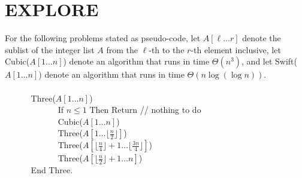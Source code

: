 \documentclass[paper=a4,fontsize=11pt]{article}
\begin{document}
\section{EXPLORE}
For the following problems stated as pseudo-code, let $A[\ell\dots r]$ denote the sublist of the integer list $A$ from the $\ell$-th to the $r$-th element inclusive, let Cubic($A[1\dots n]$) denote an algorithm that runs in time $\Theta(n^3)$, and let Swift($A[1\dots n]$) denote an algorithm that runs in time $\Theta(n\log(\log n))$.\\
{\ttfamily
$\phantom{A}$\\
$\phantom{---}$ Three($A[1\dots n]$)\\
$\phantom{--- ---}$ If $n \leq 1$ Then Return // nothing to do\\
$\phantom{--- ---}$ Cubic($A[1\dots n]$)\\
$\phantom{--- ---}$ Three($A[1\dots\lfloor\frac{n}{2}\rfloor]$)\\
$\phantom{--- ---}$ Three($A[\lfloor\frac{n}{4}\rfloor+1\dots \lfloor\frac{3n}{4}\rfloor]$)\\
$\phantom{--- ---}$ Three($A[\lfloor\frac{n}{2}\rfloor+1\dots n]$)\\
$\phantom{---}$ End Three.
}
\end{document}
